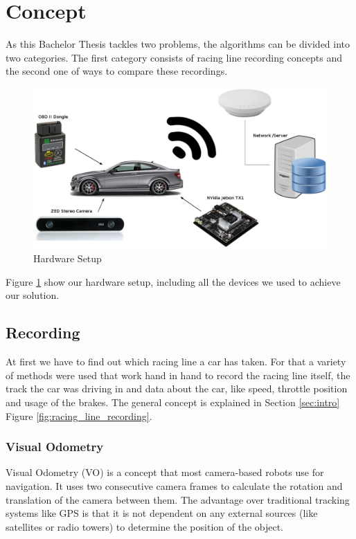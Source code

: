 \section{Concept}
\label{sec:algorithm}
\graphicspath{{utils/}}
As this Bachelor Thesis tackles two problems, the algorithms can be divided into two categories.
The first category consists of racing line recording concepts and the second one of ways to compare these recordings.

\begin{figure}[!ht]
\centering
\includegraphics[width=\textwidth]{hw_setup}
\caption{Hardware Setup}
\label{fig:hw_setup}
\end{figure}

Figure \ref{fig:hw_setup} show our hardware setup, including all the devices we used to achieve our solution.

\subsection{Recording}
At first we have to find out which racing line a car has taken. For that a variety of methods were used that work hand in hand to record the racing line itself, the track the car was driving in and data about the car, like speed, throttle position and usage of the brakes. The general concept is explained in Section \ref{sec:intro} Figure \ref{fig:racing_line_recording}.

\subsubsection{Visual Odometry}
\label{subsec:vo}
Visual Odometry (VO) is a concept that most camera-based robots use for navigation. It uses two consecutive camera frames to calculate the rotation and translation of the camera between them. The advantage over traditional tracking systems like GPS is that it is not dependent on any external sources (like satellites or radio towers) to determine the position of the object.


